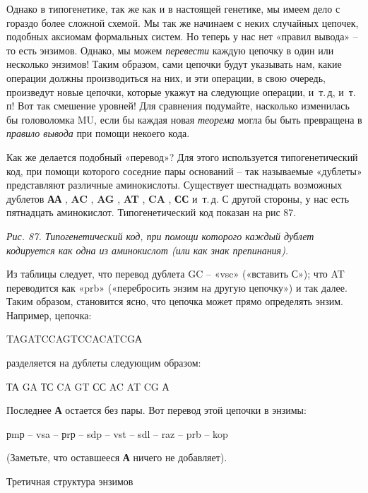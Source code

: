 \documentclass[../main.tex]{subfiles}
\begin{document}
Однако в типогенетике, так же как и в настоящей генетике, мы имеем дело с гораздо более сложной схемой. Мы так же начинаем с неких случайных цепочек, подобных аксиомам формальных систем. Но теперь у нас нет «правил вывода» \--- то есть энзимов. Однако, мы можем \emph{перевести} каждую цепочку в один или несколько энзимов! Таким образом, сами цепочки будут указывать нам, какие операции должны производиться на них, и эти операции, в свою очередь, произведут новые цепочки, которые укажут на следующие операции, и~т.\,д, и~т.\,п! Вот так смешение уровней! Для сравнения подумайте, насколько изменилась бы головоломка MU, если бы каждая новая \emph{теорема} могла бы быть превращена в \emph{правило вывода} при помощи некоего кода.

Как же делается подобный «перевод»? Для этого используется типогенетический код, при помощи которого соседние пары оснований \--- так называемые «дублеты» представляют различные аминокислоты. Существует шестнадцать возможных дублетов \textbf{АА} , \textbf{AC} , \textbf{AG} , \textbf{AT} , \textbf{CA} , \textbf{СС} и~т.\,д. С другой стороны, у нас есть пятнадцать аминокислот. Типогенетический код показан на рис 87.

\emph{Рис. 87. Типогенетический код, при помощи которого каждый дублет кодируется как одна из аминокислот (или как знак препинания).}

Из таблицы следует, что перевод дублета GC \--- «vsc» («вставить С»); что AT переводится как «prb» («перебросить энзим на другую цепочку») и так далее. Таким образом, становится ясно, что цепочка может прямо определять энзим. Например, цепочка:

TAGATCCAGTCCACATCGА

разделяется на дублеты следующим образом:

ТА GA ТС CA GT СС AC AT CG А

Последнее \textbf{А} остается без пары. Вот перевод этой цепочки в энзимы:

рmр \--- vsa \--- рrр \--- sdp \--- vst \--- sdl \--- raz \--- prb \--- kop

(Заметьте, что оставшееся \textbf{А} ничего не добавляет).

Третичная структура энзимов
\end{document}
